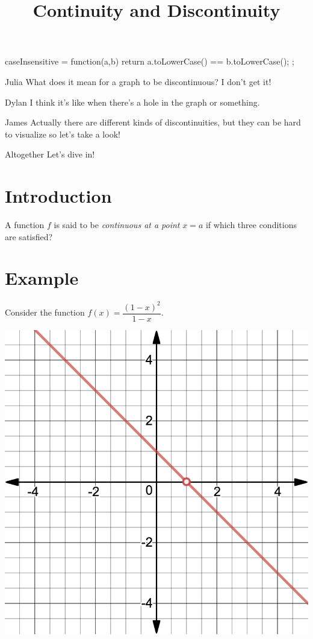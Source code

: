 \documentclass{ximera}
\title{Continuity and Discontinuity}
\begin{document}
\begin{javascript}
 caseInsensitive = function(a,b) {
    return a.toLowerCase() == b.toLowerCase();
  };
\end{javascript}
\maketitle
\begin{dialogue}
\item[Julia]What does it mean for a graph to be discontinuous? I don't get it!
\item[Dylan] I think it's like when there's a hole in the graph or something.
\item[James] Actually there are different kinds of discontinuities, but they can be hard to visualize so let's take a look!
\item[Altogether] Let's dive in!
\end{dialogue}
\section{Introduction}
\begin{question}
A function $f$ is said to be \textit{continuous at a point} $x = a$ if which three conditions are satisfied?
\begin{selectAll}
\end{selectAll}
\end{question}
\section{Example}
Consider the function $f(x) = \dfrac{(1-x)^2}{1-x}$.

\begin{image}
\includegraphics{continuity.png}
\end{image}
\end{document}
